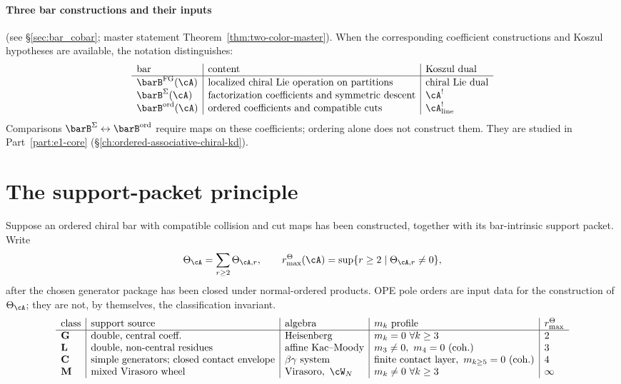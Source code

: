 \paragraph{Three bar constructions and their inputs}
(see \S\ref{sec:bar_cobar}; master statement
Theorem~\ref{thm:two-color-master}). When the corresponding
coefficient constructions and Koszul hypotheses are available,
the notation distinguishes:
\[
 \begin{array}{l|l|l}
 \text{bar} & \text{content} & \text{Koszul dual} \\
 \hline
 \barB^{\mathrm{FG}}(\cA) & \text{localized chiral Lie operation on partitions} & \text{chiral Lie dual} \\
 \barB^{\Sigma}(\cA) & \text{factorization coefficients and symmetric descent} & \cA^! \\
 \barB^{\mathrm{ord}}(\cA) & \text{ordered coefficients and compatible cuts} & \cA^!_{\mathrm{line}}
 \end{array}
\]
Comparisons $\barB^{\Sigma} \leftrightarrow\barB^{\mathrm{ord}}$
require maps on these coefficients; ordering alone does not
construct them. They are studied in
Part~\ref{part:e1-core} (\S\ref{ch:ordered-associative-chiral-kd}).

\section*{The support-packet principle}
\label{sec:pole-order-principle}

Suppose an ordered chiral bar with compatible collision and cut
maps has been constructed, together with its bar-intrinsic
support packet. Write
\[
\Theta_\cA=\sum_{r\ge2}\Theta_{\cA,r},
\qquad
r^\Theta_{\max}(\cA)=\sup\{r\ge2\mid\Theta_{\cA,r}\ne0\},
\]
after the chosen generator package has been closed under
normal-ordered products. OPE pole orders are input data for the
construction of \(\Theta_\cA\); they are not, by themselves, the
classification invariant.
\[
 \begin{array}{l|l|l|l|l}
 \text{class} & \text{support source} & \text{algebra} & m_k \text{ profile} & r^\Theta_{\max} \\
 \hline
 \mathbf{G} & \text{double, central coeff.} & \text{Heisenberg} & m_k = 0\ \forall k \ge 3 & 2 \\
 \mathbf{L} & \text{double, non-central residues} & \text{affine Kac--Moody} & m_3 \ne 0,\ m_4 = 0\ \text{(coh.)} & 3 \\
 \mathbf{C} & \text{simple generators; closed contact envelope} & \beta\gamma\text{ system} & \text{finite contact layer},\ m_{k\ge 5} = 0\ \text{(coh.)} & 4 \\
 \mathbf{M} & \text{mixed Virasoro wheel} & \text{Virasoro},\ \cW_N & m_k \ne 0\ \forall k \ge 3 & \infty \\
 \end{array}
\]

